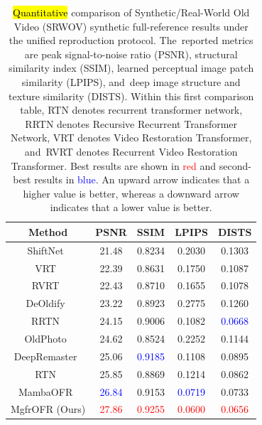 \documentclass[symmetry,article,accept,pdftex,moreauthors]{Definitions/mdpi}
\DeclareRobustCommand{\bestres}[1]{\textcolor{red}{#1}}
\DeclareRobustCommand{\secondres}[1]{\textcolor{blue}{#1}}
\begin{document}
\begin{table}[H]
\caption{\hl{Quantitative} %
 comparison of Synthetic/Real-World Old Video (SRWOV) synthetic full-reference results under the unified reproduction protocol. The~reported metrics are peak signal-to-noise ratio (PSNR), structural similarity index (SSIM), learned perceptual image patch similarity (LPIPS), and~deep image structure and texture similarity (DISTS). Within this first comparison table, RTN denotes recurrent transformer network, RRTN denotes Recursive Recurrent Transformer Network, VRT denotes Video Restoration Transformer, and~RVRT denotes Recurrent Video Restoration Transformer. Best results are shown in \bestres{red} and second-best results in \secondres{blue}. An upward arrow indicates that a higher value is better, whereas a downward arrow indicates that a lower value is better.\label{tab:sota}}
\begin{tabularx}{\textwidth}{cCCCC}
\toprule
\textbf{Method} & \textbf{PSNR \boldmath{$\uparrow$}} & \textbf{SSIM \boldmath{$\uparrow$}} & \textbf{LPIPS \boldmath{$\downarrow$}} & \textbf{DISTS \boldmath{$\downarrow$}} \\
\midrule
ShiftNet~\cite{li2023shiftnet}          & 21.48 & 0.8234 & 0.2030 & 0.1303 \\
VRT~\cite{liang2024vrt}                 & 22.39 & 0.8631 & 0.1750 & 0.1087 \\
RVRT~\cite{liang2022rvrt}              & 22.43 & 0.8710 & 0.1655 & 0.1078 \\
DeOldify~\cite{jantic2019deoldify}      & 23.22 & 0.8923 & 0.2775 & 0.1260 \\
RRTN~\cite{lin2024rrtn}                & 24.15 & 0.9006 & 0.1082 & \secondres{0.0668} \\
OldPhoto~\cite{wan2023oldphotopami}     & 24.62 & 0.8524 & 0.2252 & 0.1144 \\
DeepRemaster~\cite{iizuka2019deepremaster} & 25.06 & \secondres{0.9185} & 0.1108 & 0.0895 \\
RTN~\cite{wan2022rtn}                   & 25.85 & 0.8869 & 0.1214 & 0.0862 \\
MambaOFR~\cite{mao2025mambaofr}        & \secondres{26.84} & 0.9153 & \secondres{0.0719} & 0.0733 \\
\midrule
MgfrOFR (Ours)                          & \bestres{27.86} & \bestres{0.9255} & \bestres{0.0600} & \bestres{0.0656} \\
\bottomrule
\end{tabularx}
\end{table}
\end{document}
